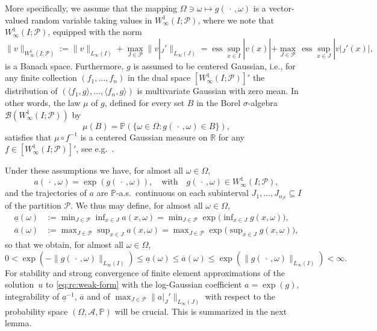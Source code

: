 \documentclass[reqno]{amsart}
\numberwithin{equation}{section}
\newcommand{\bbP}{\mathbb{P}}
\newcommand{\bbR}{\mathbb{R}}
\newcommand{\cA}{\mathcal{A}}
\newcommand{\cB}{\mathcal{B}}
\newcommand{\cP}{\mathcal{P}}
\newcommand{\norm}[2]{     \| #1       \|_{ #2 }}
\newcommand{\duality}[1]{     \langle #1       \rangle}
\theoremstyle{remark}
\theoremstyle{definition}
\begin{document}
More specifically, 
we assume that 
the mapping 
$\Omega\ni\omega\mapsto g(\,\cdot\,, \omega)$ 
is a vector-valued random variable 
taking values in 
$W^1_\infty(I;\cP)$, 
where we note that 
$W^1_\infty(I;\cP)$, 
equipped with the norm 
\[
\norm{v}{W^1_\infty(I;\cP)}
:= 
\norm{ v }{L_\infty(I)} 
+ 
\max_{J\in\cP} 
\norm{ v|_J' }{L_\infty(J)} 
=
\operatorname{ess}\sup_{x\in I} | v(x) |
+ 
\max_{J\in\cP} \,
\operatorname{ess}\sup_{x\in J} | v|_J'(x) |, 
\]
is a Banach space. 
% 
Furthermore, 
$g$ is assumed to be centered Gaussian, 
i.e., for any finite collection 
$( f_1,\ldots,f_n )$ in the dual space 
$[W^1_\infty(I;\cP)]'$ 
the distribution of 
$(\duality{f_1,g},\ldots,\duality{f_n,g})$ 
is multivariate Gaussian 
with zero mean. 
In other words, 
the law $\mu$ of $g$, defined 
for every set $B$ in the Borel 
$\sigma$-algebra $\cB(W^1_\infty(I;\cP))$ by 
%
\[
\mu(B) 
= 
\bbP( \{\omega \in\Omega : g(\,\cdot\, , \omega) \in B\}),
\]
%
satisfies that 
$\mu\circ f^{-1}$ is a centered Gaussian measure on $\bbR$ 
for any $f \in [W^1_\infty(I;\cP)]'$\!, 
see e.g.\ \cite[Definition~2.2.1]{Bogachev1998}. 


Under these assumptions we have, for almost all $\omega\in\Omega$, 
%
\begin{equation}\label{eq:a-log-gauss}
a(\,\cdot\,,\omega) =\exp(g(\,\cdot\,,\omega)), 
\quad\text{with} 
\quad 
g(\,\cdot\,,\omega)\in W^1_\infty(I;\cP), 
\end{equation}
%
and the trajectories of $a$ are $\bbP$-a.s.\ 
continuous on each subinterval $J_1,\ldots,J_{n_{\cP}} \subseteq I$ 
of the partition $\cP$. 
We thus may define, for almost all $\omega\in\Omega$, 
% 
\begin{equation}\label{eq:def:a-rvs} 
\begin{split} 
\underline{a}(\omega) 
&:= 
\min\nolimits_{J\in\cP} \inf\nolimits_{x\in J}  
a(x,\omega) 
= 
\min\nolimits_{J\in\cP}  
\exp\bigl( \inf\nolimits_{x\in J} g(x,\omega) \bigr), 
\\ 
\overline{a}(\omega) 
&:= 
\max\nolimits_{J\in\cP}\sup\nolimits_{x\in J} 
a(x,\omega) 
= 
\max\nolimits_{J\in\cP} 
\exp\bigl( \sup\nolimits_{x\in J} g(x,\omega) \bigr),  
\end{split} 
\end{equation}
%
so that we obtain, for almost all $\omega\in\Omega$, 
%
\[
0 <
\exp( - \norm{ g(\,\cdot\,,\omega) }{L_\infty(I)} ) 
\leq 
\underline{a}(\omega) 
\leq 
\overline{a}(\omega) 
\leq 
\exp( \norm{ g(\,\cdot\,, \omega) }{L_\infty(I)}) 
< \infty. 
\]
%
For stability and strong convergence of 
finite element approximations 
of the solution~$u$ to \eqref{eq:rc:weak-form}  
with the log-Gaussian coefficient $a=\exp(g)$, 
integrability of $\underline{a}^{-1}$\!, $\overline{a}$ 
and of $\max_{J\in\cP}\norm{a|_J'}{L_\infty(J)}$ 
with respect to the 
probability space $(\Omega,\cA,\bbP)$ will be crucial. 
This is summarized in the next lemma. 
\end{document}
